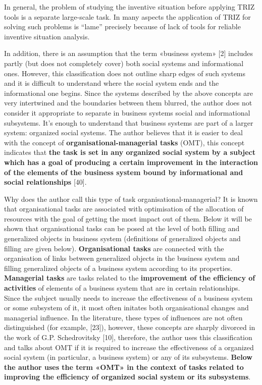 \documentclass[11pt,a4paper]{book}
\begin{document}
In general, the problem of studying the inventive situation before applying
TRIZ tools is a separate large-scale task. In many aspects the application of
TRIZ for solving such problems is “lame” precisely because of lack of tools
for reliable inventive situation analysis.

In addition, there is an assumption that the term «business system» [2]
includes partly (but does not completely cover) both social systems and
informational ones.  However, this classification does not outline sharp edges
of such systems and it is difficult to understand where the social system ends
and the informational one begins. Since the systems described by the above
concepts are very intertwined and the boundaries between them blurred, the
author does not consider it appropriate to separate in business systems social
and informational subsystems.  It’s enough to understand that business systems
are part of a larger system: organized social systems.  The author believes
that it is easier to deal with the concept of
\textbf{organisational-managerial tasks} (OMT), this concept indicates that
\textbf{the task is set in any organized social system by a subject which has
  a goal of producing a certain improvement in the interaction of the elements
  of the business system bound by informational and social relationships}
       [40].

Why does the author call this type of task organisational-managerial?  It is
known that organisational tasks are associated with optimisation of the
allocation of resources with the goal of getting the most impact out of them.
Below it will be shown that organisational tasks can be posed at the level of
both filling and generalized objects in business system (definitions of
generalized objects and filling are given below). \textbf{Organisational
  tasks} are connected with the organisation of links between generalized
objects in the business system and filling generalized objects of a business
system according to its properties.  \textbf{Managerial tasks} are tasks
related to the \textbf{improvement of the efficiency of activities} of
elements of a business system that are in certain relationships. Since the
subject usually needs to increase the effectiveness of a business system or
some subsystem of it, it most often initates both organisational changes and
managerial influence.  In the literature, these types of influences are not
often distinguished (for example, [23]), however, these concepts are sharply
divorced in the work of G.P. Schedrovitsky [10], therefore, the author uses
this classification and talks about OMT if it is required to increase the
effectiveness of a organized social system (in particular, a business system)
or any of its subsystems. \textbf{Below the author uses the term «OMT» in the
  context of tasks related to improving the efficiency of organized social
  system or its subsystems}.
\end{document}
